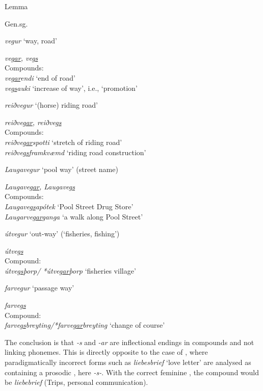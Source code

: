 \documentclass[output=paper]{LSP/langsci}
\begin{document}
\ea%
 \label{ex:bjarnadottir:5} 
\begin{xlist}
 \sn  \parbox{6cm}{Lemma}{ Gen.sg.}\\
\ex \parbox{6cm}{\textit{vegur} ‘way, road’} \textit{veg\underline{ar}, veg\underline{s}}\\
Compounds:\\
\textit{veg\underline{ar}endi} ‘end of road’\\
\textit{veg\underline{s}auki} ‘increase of way’, i.e., ‘promotion’

\ex \parbox{6cm}{\textit{reiðvegur} ‘(horse) riding road’} \textit{reiðveg\underline{ar}, reiðveg\underline{s}}\\
Compounds:\\ 
\textit{reiðveg\underline{ar}spotti} ‘stretch of riding road’\\
\textit{reiðveg\underline{s}framkvæmd} ‘riding road construction’

\ex \parbox{6cm}{\textit{Laugavegur} ‘pool way’ (street name)} \textit{Laugaveg\underline{ar}, Laugaveg\underline{s}}\\
Compounds:\\
\textit{Laugaveg\underline{s}apótek} ‘Pool Street Drug Store’\\
\textit{Laugarveg\underline{ar}ganga} ‘a walk along Pool Street’

\ex \parbox{6cm}{\textit{útvegur} ‘out-way’ (‘fisheries, fishing’)} \textit{útveg\underline{s}}\\
Compound:\\  
\textit{útveg\underline{s}þorp/ *útveg\underline{ar}þorp} ‘fisheries village’

\ex \parbox{6cm}{\textit{farvegur} ‘passage way’} \textit{farveg\underline{s}}\\
Compound:\\ 

\textit{farveg\underline{s}breyting/*farveg\underline{ar}breyting} ‘change of course’
\end{xlist}
\z\largerpage[2]

The conclusion is that \textit{-s} and \textit{-ar} are inflectional endings in  compounds and not linking phonemes. This is directly opposite to the case of , where paradigmatically incorrect forms such as \textit{liebesbrief} ‘love letter’ are analysed as containing a prosodic , here \textit{-s-}. With the correct feminine , the compound would be \textit{liebebrief} (Trips, personal communication).
\end{document}
